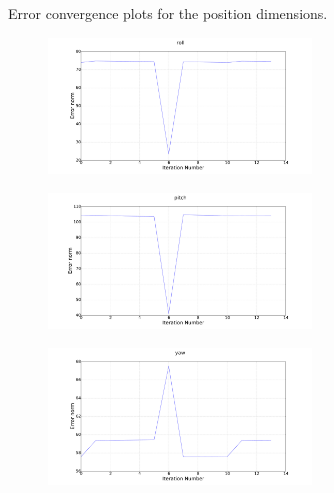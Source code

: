 \begin{figure}
\begin{subfigure}{0.48\textwidth}
\begin{subfigure}{\textwidth}
    \end{subfigure}
    \caption{Error convergence plots for the position dimensions.}
  \end{subfigure}
  \begin{subfigure}{0.48\textwidth}
    \begin{subfigure}{\textwidth}
      \includegraphics[clip, trim = 100 0 100 0, width=\textwidth]{figures/chapter3/err_roll}
    \end{subfigure}
    \begin{subfigure}{\textwidth}
      \includegraphics[clip, trim = 100 0 100 0, width=\textwidth]{figures/chapter3/err_pitch}
    \end{subfigure}
    \begin{subfigure}{\textwidth}
      \includegraphics[clip, trim = 100 0 100 0, width=\textwidth]{figures/chapter3/err_yaw}

\end{subfigure}
\end{subfigure}
\end{figure}
